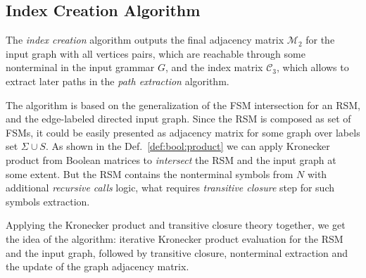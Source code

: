 \subsection{Index Creation Algorithm}

The \textit{index creation} algorithm outputs the final adjacency matrix $\mathcal{M}_2$
for the input graph with all vertices pairs, which are reachable through some nonterminal 
in the input grammar $G$, and the index matrix $\mathcal{C}_3$, which allows to extract
later paths in the \textit{path extraction} algorithm.

The algorithm is based on the generalization of the FSM intersection for an RSM, 
and the edge-labeled directed input graph. Since the RSM is composed as set of FSMs, 
it could be easily presented as adjacency matrix for some graph over labels set 
$\Sigma \cup S$. As shown in the Def.~\ref{def:bool:product} we can apply 
Kronecker product from Boolean matrices to \textit{intersect} the RSM and the 
input graph at some extent. But the RSM contains the  nonterminal symbols from $N$ 
with additional \textit{recursive calls} logic, what requires \textit{transitive closure} 
step for such symbols extraction.

Applying the Kronecker product and transitive closure theory together, we get the idea 
of the algorithm: iterative Kronecker product evaluation for the RSM and the input 
graph, followed by transitive closure, nonterminal extraction and the update 
of the graph adjacency matrix.



